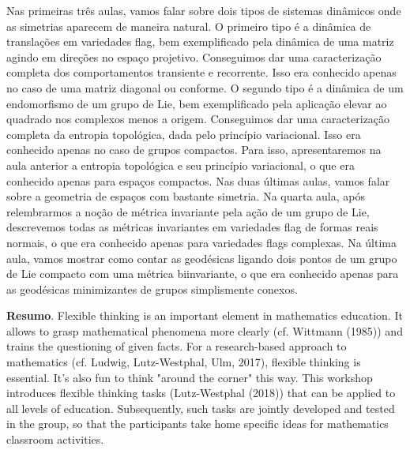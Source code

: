 	Nas primeiras três aulas, vamos falar sobre dois tipos de sistemas dinâmicos onde as simetrias aparecem de maneira natural. O primeiro tipo é a dinâmica de translações em variedades flag, bem exemplificado pela dinâmica de uma matriz agindo em direções no espaço projetivo. Conseguimos dar uma caracterização completa dos comportamentos transiente e recorrente. Isso era conhecido apenas no caso de uma matriz diagonal ou conforme. O segundo tipo é a dinâmica de um endomorfismo de um grupo de Lie, bem exemplificado pela aplicação elevar ao quadrado nos complexos menos a origem. Conseguimos dar uma caracterização completa da entropia topológica, dada pelo princípio variacional. Isso era conhecido apenas no caso de grupos compactos. Para isso, apresentaremos na aula anterior a entropia topológica e seu princípio variacional, o que era conhecido apenas para espaços compactos.
	Nas duas últimas aulas, vamos falar sobre a geometria de espaços com bastante simetria. Na quarta aula, após relembrarmos a noção de métrica invariante pela ação de um grupo de Lie, descrevemos todas as métricas invariantes em variedades flag de formas reais normais, o que era conhecido apenas para variedades flags complexas. Na última aula, vamos mostrar como contar as geodésicas ligando dois pontos de um grupo de Lie compacto com uma métrica biinvariante, o que era conhecido apenas para as geodésicas minimizantes de grupos simplismente conexos.
	
	\vspace{24pt}
	
		
		
	\noindent\textbf{Resumo}.\label{blw} 
	Flexible thinking is an important element in mathematics education. It allows to grasp mathematical phenomena more clearly (cf. Wittmann (1985)) and trains the questioning of given facts. For a research-based approach to mathematics (cf. Ludwig, Lutz-Westphal, Ulm, 2017), flexible thinking is essential. It's also fun to think "around the corner" this way. This workshop introduces flexible thinking tasks (Lutz-Westphal (2018)) that can be applied to all levels of education. Subsequently, such tasks are jointly developed and tested in the group, so that the participants take home specific ideas for mathematics classroom activities.
		
